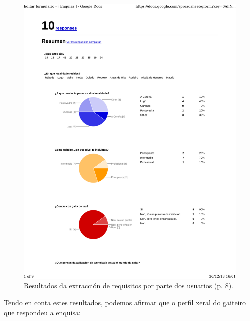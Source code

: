   \begin{figure}[htbp]
   \centering
   \includegraphics[scale=0.7,page=8,keepaspectratio=true]{./imagenes/enquisa.pdf}
   \caption{Resultados da extracción de requisitos por parte dos usuarios (p. 8).}
   \label{figura:ResultadosExtraccionRequisitosUsuarios8}
  \end{figure}

  Tendo en conta estes resultados, podemos afirmar que o perfil xeral do
  gaiteiro que respondeu a enquisa:

